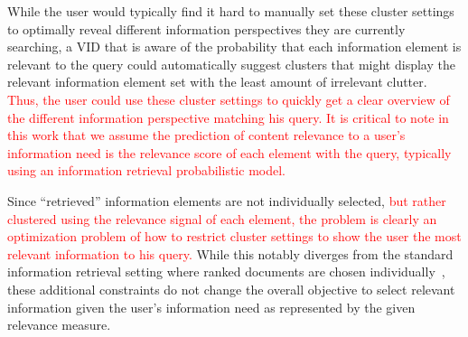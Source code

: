While the user would typically find it hard to manually set these
cluster settings to optimally reveal different information  perspectives they are
currently searching, a VID that is aware of the probability that each information element
is relevant to the query could automatically suggest clusters
that might display the relevant information element set with the least
amount of irrelevant clutter. 
\textcolor{red}{ Thus, the user could use these cluster settings to quickly get a clear overview of the different information perspective matching his query.
It is critical to note in this work that we assume the prediction of content relevance to a user's information need is the relevance score of each element with the query, typically using an information retrieval probabilistic model.}

Since ``retrieved'' information
elements are not individually selected, \textcolor{red}{ but rather clustered using the relevance signal of each element, the problem is clearly 
an optimization problem of how to restrict cluster settings to show
the user the most relevant information to his query.}
While this notably diverges from the standard information retrieval setting
where ranked documents are chosen individually~\cite{Baeza-Yates2010}, these additional constraints
do not change the overall objective to select
relevant information given the user's information need as represented by the given relevance measure. 

